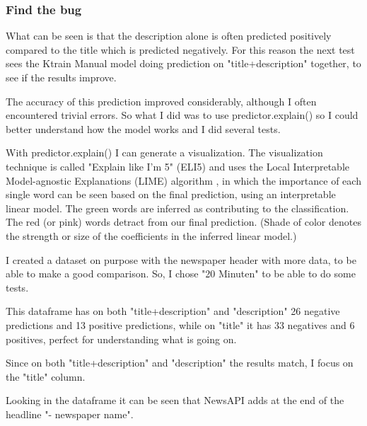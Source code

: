 \subsubsection{Find the bug}
What can be seen is that the description alone is often predicted positively compared to the title which is predicted negatively.
For this reason the next test sees the \gls{Ktrain} Manual model doing prediction on "title+description" together, to see if the results improve.

The \gls{accuracy} of this prediction improved considerably, although I often encountered trivial errors.
So what I did was to use predictor.explain() so I could better understand how the model works and I did several tests.

With predictor.explain() I can generate a visualization.
The visualization technique is called "Explain like I’m 5" (ELI5)\cite{noauthor_textexplainer_nodate} and uses the Local Interpretable Model-agnostic Explanations (LIME) algorithm \cite{ribeiro_why_2016}\cite{ribeiro_marcotcrlime_2021}, in which the importance of each single word can be seen based on the final prediction, using an interpretable linear model.
The green words are inferred as contributing to the classification. The red (or pink) words detract from our final prediction. (Shade of color denotes the strength or size of the coefficients in the inferred linear model.)

I created a dataset on purpose with the newspaper header with more data, to be able to make a good comparison.
So, I chose "20 Minuten" to be able to do some tests.

This dataframe has on both "title+description" and "description" 26 negative predictions and 13 positive predictions, while on "title" it has 33 negatives and 6 positives, perfect for understanding what is going on.

Since on both "title+description" and "description" the results match, I focus on the "title" column.

Looking in the dataframe it can be seen that NewsAPI adds at the end of the headline "- newspaper name".

